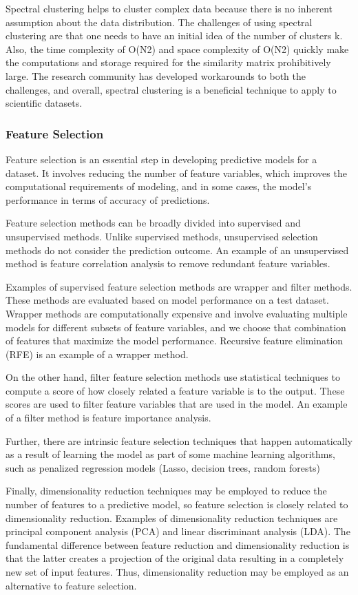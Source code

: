 Spectral clustering helps to cluster complex data because there is no inherent assumption about the data
distribution. The challenges of using spectral clustering are that one needs to have an initial idea of the number of clusters k. Also, the time complexity of O(N2) and space complexity of O(N2) quickly make the computations and storage required for the similarity matrix prohibitively large. The research community has developed workarounds to both the challenges, and overall, spectral clustering is a beneﬁcial technique to apply to scientiﬁc datasets.

\subsubsection{Feature Selection}

Feature selection is an essential step in developing predictive models for a dataset. It involves reducing the number of feature variables, which improves the computational requirements of modeling, and in some
cases, the model’s performance in terms of accuracy of predictions.

Feature selection methods can be broadly divided into supervised and unsupervised methods. Unlike
supervised methods, unsupervised selection methods do not consider the prediction outcome. An example
of an unsupervised method is feature correlation analysis to remove redundant feature variables.

Examples of supervised feature selection methods are wrapper and ﬁlter methods. These methods are
evaluated based on model performance on a test dataset. Wrapper methods are computationally expensive
and involve evaluating multiple models for different subsets of feature variables, and we choose that
combination of features that maximize the model performance. Recursive feature elimination (RFE) is an
example of a wrapper method.

On the other hand, ﬁlter feature selection methods use statistical techniques to compute a score of how
closely related a feature variable is to the output. These scores are used to ﬁlter feature variables that are used in the model. An example of a ﬁlter method is feature importance analysis.

Further, there are intrinsic feature selection techniques that happen automatically as a result of learning the model as part of some machine learning algorithms, such as penalized regression models (Lasso, decision trees, random forests)

Finally, dimensionality reduction techniques may be employed to reduce the number of features to a
predictive model, so feature selection is closely related to dimensionality reduction. Examples of
dimensionality reduction techniques are principal component analysis (PCA) and linear discriminant
analysis (LDA). The fundamental difference between feature reduction and dimensionality reduction is that
the latter creates a projection of the original data resulting in a completely new set of input features. Thus,
dimensionality reduction may be employed as an alternative to feature selection.

